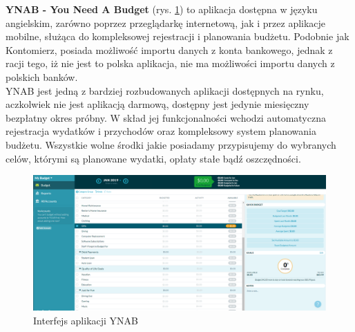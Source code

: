 \textbf{YNAB - You Need A Budget} (rys. \ref{ynab_interfejs}) to aplikacja dostępna w języku angielskim, zarówno poprzez przeglądarkę internetową, jak i przez aplikacje mobilne, służąca do kompleksowej rejestracji i planowania budżetu. Podobnie jak Kontomierz, posiada możliwość importu danych z konta bankowego, jednak z racji tego, iż nie jest to polska aplikacja, nie ma możliwości importu danych z polskich banków.\\
YNAB jest jedną z bardziej rozbudowanych aplikacji dostępnych na rynku, aczkolwiek nie jest aplikacją darmową,  dostępny jest jedynie miesięczny bezpłatny okres próbny. W skład jej funkcjonalności wchodzi automatyczna rejestracja wydatków i przychodów oraz kompleksowy system planowania budżetu. Wszystkie wolne środki jakie posiadamy przypisujemy do wybranych celów, którymi są planowane wydatki, opłaty stałe bądź oszczędności.
\begin{figure}[!ht]
	\begin{center}
		\includegraphics[width=6in]{img/aplikacje/ynab_interfejs.png}
		\caption{Interfejs aplikacji YNAB}
		\label{ynab_interfejs}
	\end{center}
\end{figure}


